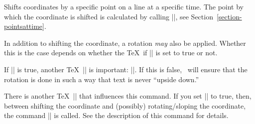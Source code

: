 \begin{command}{\pgftransformlineattime{}}
  Shifts coordinates by a specific point on a line at a specific
  time. The point by which the coordinate is shifted is calculated by
  calling |\pgfpointlineattime|, see
  Section~\ref{section-pointsattime}.

  In addition to shifting the coordinate, a rotation \emph{may} also
  be applied. Whether this is the case depends on whether the \TeX\ if
  |\ifpgfslopedattime| is set to true or not.
\begin{codeexample}[]
\end{codeexample}
\begin{codeexample}[]
\end{codeexample}
  If |\ifpgfslopedattime| is true, another \TeX\ |\if| is important:
  |\ifpgfallowupsidedowattime|. If this is false, \pgfname\ will
  ensure that the rotation is done in such a way that text is never
  ``upside down.''

  There is another \TeX\ |\if| that influences this command. If you set
  |\ifpgfresetnontranslationattime| to true, then, between
  shifting the coordinate and (possibly) rotating/sloping the
  coordinate, the command |\pgftransformresetnontranslations| is
  called. See the description of this command for details.
\begin{codeexample}[]
\end{codeexample}
\begin{codeexample}[]
\end{codeexample}
\end{command}


